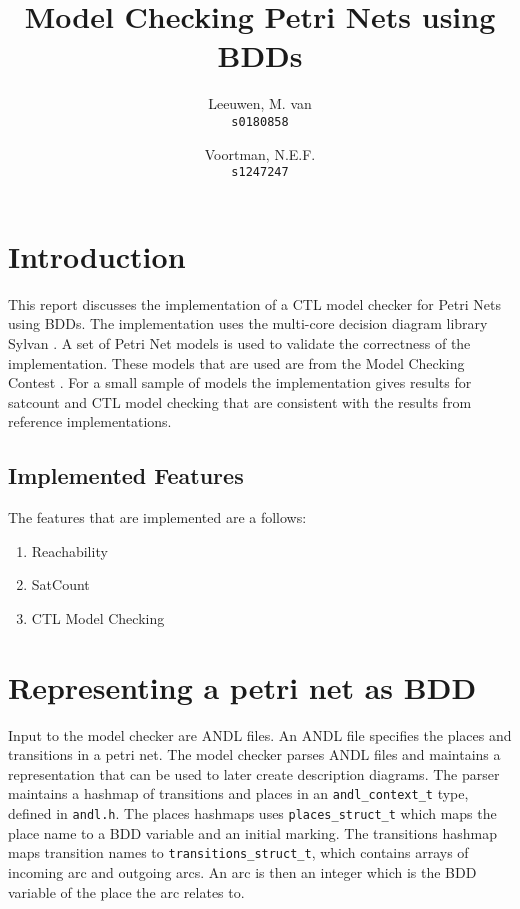 \documentclass[twoside, a4paper]{article}
\title{Model Checking Petri Nets using BDDs}
\author{Leeuwen, M. van\\
  \texttt{s0180858}\\
  \and
  Voortman, N.E.F.\\
  \texttt{s1247247}
}
\begin{document}
\maketitle

\section{Introduction}
This report discusses the implementation of a CTL model checker for Petri Nets using BDDs. The implementation uses the multi-core decision diagram library Sylvan \parencite{sylvan}. A set of Petri Net models is used to validate the correctness of the implementation. These models that are used are from the Model Checking Contest \parencite{mcc:2017}. For a small sample of models the implementation gives results for satcount and CTL model checking that are consistent with the results from reference implementations.

\subsection{Implemented Features}

The features that are implemented are a follows:
\begin{enumerate}
\item Reachability
\item SatCount
\item CTL Model Checking
\end{enumerate}
\section{Representing a petri net as BDD}
Input to the model checker are ANDL files. An ANDL file specifies the places and transitions in a petri net. The model checker parses ANDL files and maintains a representation that can be used to later create description diagrams. The parser maintains a hashmap of transitions and places in an \texttt{andl\_context\_t} type, defined in \texttt{andl.h}. The places hashmaps uses \texttt{places\_struct\_t} which maps the place name to a BDD variable and an initial marking. The transitions hashmap maps transition names to \texttt{transitions\_struct\_t}, which contains arrays of incoming arc and outgoing arcs. An arc is then an integer which is the BDD variable of the place the arc relates to.
\end{document}
